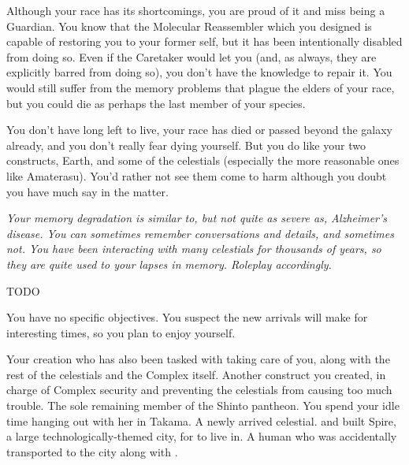\documentclass[char]{guardians}
\begin{document}
Although your race has its shortcomings, you are proud of it and miss being a Guardian. You know that the Molecular Reassembler which you designed is capable of restoring you to your former self, but it has been intentionally disabled from doing so. Even if the Caretaker would let you (and, as always, they are explicitly barred from doing so), you don't have the knowledge to repair it. You would still suffer from the memory problems that plague the elders of your race, but you could die as perhaps the last member of your species.

You don't have long left to live, your race has died or passed beyond the galaxy already, and you don't really fear dying yourself. But you do like your two constructs, Earth, and some of the celestials (especially the more reasonable ones like Amaterasu). You'd rather not see them come to harm although you doubt you have much say in the matter.

\emph{Your memory degradation is similar to, but not quite as severe as, Alzheimer's disease. You can sometimes remember conversations and details, and sometimes not. You have been interacting with many celestials for thousands of years, so they are quite used to your lapses in memory. Roleplay accordingly.}

\begin{itemz}[Goals]
  \item TODO
  \item You have no specific objectives. You suspect the new arrivals will make for interesting times, so you plan to enjoy yourself.
\end{itemz}


\begin{contacts}
  \contact{\cCaretaker{}} Your creation who has also been tasked with taking care of you, along with the rest of the celestials and the Complex itself.
  \contact{\cWarden{}} Another construct you created, in charge of Complex security and preventing the celestials from causing too much trouble.
  \contact{\cAmaterasu{}} The sole remaining member of the Shinto pantheon. You spend your idle time hanging out with her in Takama.
  \contact{\cUnity{}} A newly arrived celestial. \cWarden{} and \cCaretaker{} built Spire, a large technologically-themed city, for \cUnity{} to live in.
  \contact{\cKachiko{}} A human who was accidentally transported to the city along with \cUnity{}.
\end{contacts}
\end{document}
